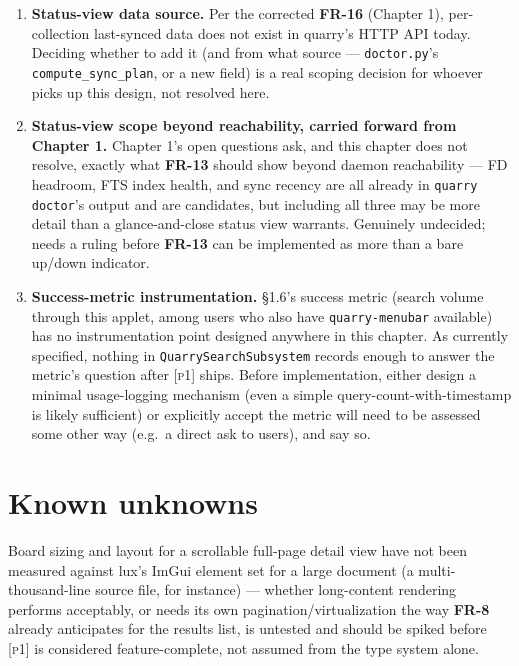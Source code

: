 \documentclass[a4paper,11pt]{report}
\newcommand{\fr}[1]{\textbf{FR-#1}}
\newcommand{\pone}{\textsc{[p1]}}
\begin{document}
\begin{enumerate}
    testing conventions (\texttt{tests/hermetic\_env.py}'s embedding-fake
    pattern) extend cleanly to a second client boundary, or whether this
    needs its own hermeticity mechanism.
  \item \textbf{Status-view data source.} Per the corrected \fr{16}
    (Chapter 1), per-collection last-synced data does not exist in
    quarry's HTTP API today. Deciding whether to add it (and from what
    source --- \texttt{doctor.py}'s \texttt{compute\_sync\_plan}, or a new
    field) is a real scoping decision for whoever picks up this design,
    not resolved here.
  \item \textbf{Status-view scope beyond reachability, carried forward
    from Chapter 1.} Chapter 1's open questions ask, and this chapter
    does not resolve, exactly what \fr{13} should show beyond daemon
    reachability --- FD headroom, FTS index health, and sync recency are
    all already in \texttt{quarry doctor}'s output and are candidates,
    but including all three may be more detail than a glance-and-close
    status view warrants. Genuinely undecided; needs a ruling before
    \fr{13} can be implemented as more than a bare up/down indicator.
  \item \textbf{Success-metric instrumentation.} \S1.6's success metric
    (search volume through this applet, among users who also have
    \texttt{quarry-menubar} available) has no instrumentation point
    designed anywhere in this chapter. As currently specified, nothing
    in \texttt{QuarrySearchSubsystem} records enough to answer the
    metric's question after \pone{} ships. Before implementation, either
    design a minimal usage-logging mechanism (even a simple
    query-count-with-timestamp is likely sufficient) or explicitly
    accept the metric will need to be assessed some other way (e.g.\ a
    direct ask to users), and say so.
\end{enumerate}

\section{Known unknowns}

Board sizing and layout for a scrollable full-page detail view have not
been measured against lux's ImGui element set for a large document (a
multi-thousand-line source file, for instance) --- whether long-content
rendering performs acceptably, or needs its own pagination/virtualization
the way \fr{8} already anticipates for the results list, is untested and
should be spiked before \pone{} is considered feature-complete, not
assumed from the type system alone.
\end{document}
